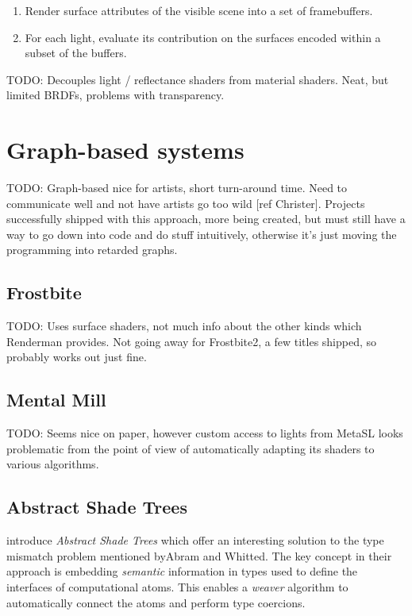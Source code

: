 \begin{enumerate}
\item Render surface attributes of the visible scene into a set of framebuffers.
\item For each light, evaluate its contribution on the surfaces encoded within a subset of the buffers.
\end{enumerate}

TODO: Decouples light / reflectance shaders from material shaders. Neat, but limited BRDFs, problems with transparency.


\section{Graph-based systems}

TODO: Graph-based nice for artists, short turn-around time. Need to communicate well and not have artists go too wild [ref Christer]. Projects successfully shipped with this approach, more being created, but must still have a way to go down into code and do stuff intuitively, otherwise it's just moving the programming into retarded graphs.

\subsection{Frostbite}

TODO: Uses surface shaders, not much info about the other kinds which Renderman provides. Not going away for Frostbite2, a few titles shipped, so probably works out just fine.

\subsection{Mental Mill}

TODO: Seems nice on paper, however custom access to lights from MetaSL looks problematic from the point of view of automatically adapting its shaders to various algorithms.

\subsection{Abstract Shade Trees}

\citet{mcguire2006shadetrees} introduce \emph{Abstract Shade Trees} which offer an interesting solution to the type mismatch problem mentioned byAbram and Whitted. The key concept in their approach is embedding \emph{semantic} information in types used to define the interfaces of computational atoms. This enables a \emph{weaver} algorithm to automatically connect the atoms and perform type coercions.


